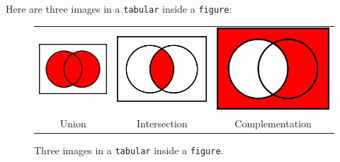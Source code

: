 Here are three images in a {\tt tabular} inside a {\tt figure}:
\begin{figure}[ht]
\centering
\begin{tabular}{ccc}
\includegraphics[scale=0.25]{AcupB}
&
\includegraphics[scale=0.25]{AcapB}
&
\includegraphics[scale=0.25]{Acomp}
\\
Union & Intersection & Complementation
\\
\end{tabular}
\caption{Three images in a {\tt tabular} inside a \texttt{figure}.\label{fig:setops-tabular}}
\end{figure}

